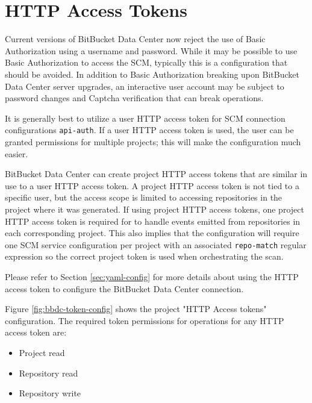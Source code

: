 \section{\cxoneflowtext\space HTTP Access Tokens}

Current versions of BitBucket Data Center now reject the use of Basic Authorization using
a username and password. While it may be possible to use Basic Authorization to access the SCM, typically
this is a configuration that should be avoided.  In addition to Basic Authorization breaking upon BitBucket Data Center
server upgrades, an interactive user account may be subject to password changes and Captcha verification that
can break \cxoneflow operations.  

It is generally best to utilize a user HTTP access token for SCM connection
configurations \texttt{api-auth}.  If a user HTTP access token is used, the user can be granted
permissions for multiple projects; this will make the \cxoneflow configuration much easier. 

BitBucket Data Center can create project HTTP access tokens that are similar in use to
a user HTTP access token.  A project HTTP access token is not tied to a specific user, but the
access scope is limited to accessing repositories in the project where it was generated.
If using project HTTP access tokens, one project HTTP access token is required for \cxoneflow
to handle events emitted from repositories in each corresponding project. This also implies that
the \cxoneflow configuration will require one SCM service configuration per project with an
associated \texttt{repo-match} regular expression so the correct project token is used when
orchestrating the scan.

Please refer to Section \ref{sec:yaml-config} for more details about using the HTTP access token
to configure the BitBucket Data Center connection.

Figure \ref{fig:bbdc-token-config} shows the project "HTTP Access tokens" configuration.  The required
token permissions for \cxoneflow operations for any HTTP access token are:

\begin{itemize}
    \item Project read
    \item Repository read
    \item Repository write
\end{itemize}


